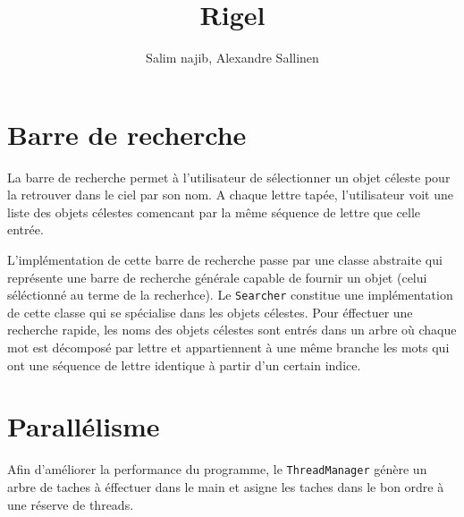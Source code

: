\documentclass[10pt,a4paper]{report}
\author{Salim najib, Alexandre Sallinen}
\title{Rigel}
\begin{document}
\newcommand{\code}[1]{\texttt{#1}}
\section{Barre de recherche}

La barre de recherche permet à l'utilisateur de sélectionner un objet céleste pour la retrouver dans le ciel par son nom. A chaque lettre tapée, l'utilisateur voit une liste des objets célestes comencant par la même séquence de lettre que celle entrée. 

L'implémentation de cette barre de recherche passe par une classe abstraite qui représente une barre de recherche générale capable de fournir un objet (celui séléctionné au terme de la recherhce). Le \code{Searcher} constitue une implémentation de cette classe qui se spécialise dans les objets célestes. Pour éffectuer une recherche rapide, les noms des objets célestes sont entrés dans un arbre où chaque mot est décomposé par lettre et appartiennent à une même branche les mots qui ont une séquence de lettre identique à partir d'un certain indice.

\section{Parallélisme}

Afin d'améliorer la performance du programme, le \code{ThreadManager} génère un arbre de taches à éffectuer dans le main et asigne les taches dans le bon ordre à une réserve de threads.
\end{document}
